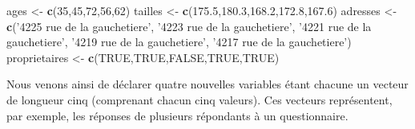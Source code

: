 \documentclass[
  11pt,
  french,
]{book}
\makeatletter
\newenvironment{Shaded}{\begin{snugshade}}{\end{snugshade}}
\newcommand{\DecValTok}[1]{\textcolor[rgb]{0.00,0.00,0.81}{#1}}
\newcommand{\FloatTok}[1]{\textcolor[rgb]{0.00,0.00,0.81}{#1}}
\newcommand{\KeywordTok}[1]{\textcolor[rgb]{0.13,0.29,0.53}{\textbf{#1}}}
\newcommand{\NormalTok}[1]{#1}
\newcommand{\OtherTok}[1]{\textcolor[rgb]{0.56,0.35,0.01}{#1}}
\newcommand{\StringTok}[1]{\textcolor[rgb]{0.31,0.60,0.02}{#1}}
\newenvironment{kframe}{%
\medskip{}
\setlength{\fboxsep}{.8em}
 \def\at@end@of@kframe{}%
 \ifinner\ifhmode%
  \def\at@end@of@kframe{\end{minipage}}%
  \begin{minipage}{\columnwidth}%
 \fi\fi%
 \def\FrameCommand##1{\hskip\@totalleftmargin \hskip-\fboxsep
 \colorbox{shadecolor}{##1}\hskip-\fboxsep
     \hskip-\linewidth \hskip-\@totalleftmargin \hskip\columnwidth}%
 \MakeFramed {\advance\hsize-\width
   \@totalleftmargin\z@ \linewidth\hsize
   \@setminipage}}%
 {\par\unskip\endMakeFramed%
 \at@end@of@kframe}
\renewenvironment{Shaded}{\begin{kframe}}{\end{kframe}}
\makeatother
\begin{document}
\begin{Shaded}
\begin{Highlighting}[]
\NormalTok{ages <-}\StringTok{ }\KeywordTok{c}\NormalTok{(}\DecValTok{35}\NormalTok{,}\DecValTok{45}\NormalTok{,}\DecValTok{72}\NormalTok{,}\DecValTok{56}\NormalTok{,}\DecValTok{62}\NormalTok{)}
\NormalTok{tailles <-}\StringTok{ }\KeywordTok{c}\NormalTok{(}\FloatTok{175.5}\NormalTok{,}\FloatTok{180.3}\NormalTok{,}\FloatTok{168.2}\NormalTok{,}\FloatTok{172.8}\NormalTok{,}\FloatTok{167.6}\NormalTok{)}
\NormalTok{adresses <-}\StringTok{ }\KeywordTok{c}\NormalTok{(}\StringTok{'4225 rue de la gauchetiere'}\NormalTok{,}
              \StringTok{'4223 rue de la gauchetiere'}\NormalTok{,}
              \StringTok{'4221 rue de la gauchetiere'}\NormalTok{,}
              \StringTok{'4219 rue de la gauchetiere'}\NormalTok{,}
              \StringTok{'4217 rue de la gauchetiere'}\NormalTok{)}
\NormalTok{proprietaires <-}\StringTok{ }\KeywordTok{c}\NormalTok{(}\OtherTok{TRUE}\NormalTok{,}\OtherTok{TRUE}\NormalTok{,}\OtherTok{FALSE}\NormalTok{,}\OtherTok{TRUE}\NormalTok{,}\OtherTok{TRUE}\NormalTok{)}
\end{Highlighting}
\end{Shaded}

Nous venons ainsi de déclarer quatre nouvelles variables étant chacune un vecteur de longueur cinq (comprenant chacun cinq valeurs). Ces vecteurs représentent, par exemple, les réponses de plusieurs répondants à un questionnaire.
\end{document}
